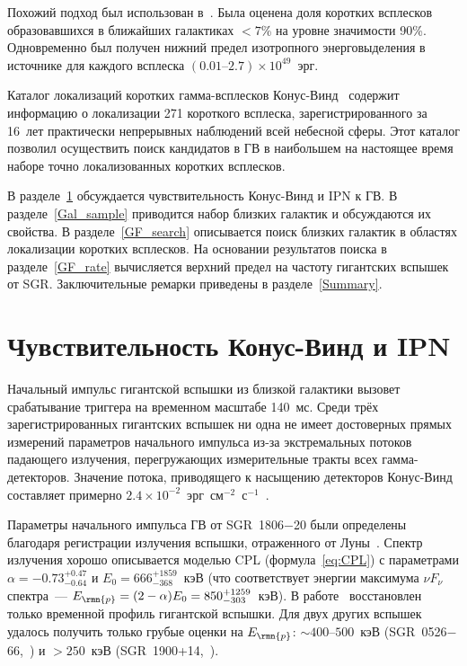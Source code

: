 Похожий подход был использован в~\citep{Tikhomirova2010AstL}. Была оценена доля 
коротких всплесков образовавшихся в ближайших галактиках $<7$\% на уровне значимости 90\%. 
Одновременно был получен нижний предел изотропного энерговыделения в источнике 
для каждого всплеска $(0.01\textrm{--}2.7)\times 10^{49}$~эрг.

Каталог локализаций коротких гамма-всплесков Конус-Винд~\citep{Palshin2013} 
содержит информацию о локализации 271 короткого всплеска, зарегистрированного за 16~лет 
практически непрерывных наблюдений всей небесной сферы. Этот каталог позволил 
осуществить поиск кандидатов в ГВ в наибольшем на настоящее время наборе точно 
локализованных коротких всплесков.

В разделе~\ref{KW_sensitivity} обсуждается чувствительность Конус-Винд и IPN к ГВ.
В разделе~\ref{Gal_sample} приводится набор близких галактик и обсуждаются их свойства. 
В разделе~\ref{GF_search} описывается поиск близких галактик в областях локализации 
коротких всплесков. На основании результатов поиска в разделе~\ref{GF_rate} 
вычисляется верхний предел на частоту гигантских вспышек от SGR. Заключительные 
ремарки приведены в разделе~\ref{Summary}.

\section{Чувствительность Конус-Винд и IPN}\label{KW_sensitivity}
Начальный импульс гигантской вспышки из близкой галактики вызовет срабатывание 
триггера на временном масштабе 140~мс. Среди трёх зарегистрированных гигантских 
вспышек ни одна не имеет достоверных прямых измерений параметров начального импульса 
из-за экстремальных потоков падающего излучения, перегружающих измерительные 
тракты всех гамма-детекторов. Значение потока, приводящего к насыщению детекторов 
Конус-Винд составляет примерно $2.4 \times 10^{-2}$~эрг~см$^{-2}$~с$^{-1}$~\citep{Mazets1999a}.

Параметры начального импульса ГВ от SGR~1806$-$20 были определены благодаря 
регистрации излучения вспышки, отраженного от Луны~\citep{Frederiks2007}. 
Спектр излучения хорошо описывается моделью CPL (формула~\ref{eq:CPL}) с параметрами
$\alpha=-0.73_{-0.64}^{+0.47}$ и $E_{0}=666^{+1859}_{-368}$~кэВ 
(что соответствует энергии максимума $\nu F_{\nu}$ спектра~--- 
$E_{\rmn{p}} = (2-\alpha)E_0 = 850^{+1259}_{-303}$~кэВ). В работе~\citep{Terasawa2005} 
восстановлен только временной профиль гигантской вспышки. 
Для двух других вспышек удалось получить только грубые оценки на $E_{\rmn{p}}$: 
$\sim 400\textrm{--}500$~кэВ (SGR~0526$-$66,~\citep{Golenetskii1979SvAL, Mazets1979}) 
и $>250$~кэВ (SGR~1900+14,~\citep{Hurley1999, Mazets1999}).

